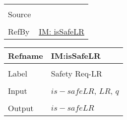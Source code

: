\documentclass[12pt]{article}
\begin{document}
\begin{minipage}{\textwidth}
\begin{tabular}{>{\raggedright}p{}>{\raggedright\arraybackslash}p{}}
\\ \midrule \\
Source & \cite{astm2009}
         
\\ \midrule \\
RefBy & \hyperref[IM:isSafeLR]{IM: isSafeLR}
        
\\ \bottomrule
\end{tabular}
\end{minipage}
\vspace{\baselineskip}
\noindent
\begin{minipage}{\textwidth}
\begin{tabular}{>{\raggedright}p{}>{\raggedright\arraybackslash}p{}}
\toprule \textbf{Refname} & \textbf{IM:isSafeLR}
\label{IM:isSafeLR}
\\ \midrule \\
Label & Safety Req-LR
        
\\ \midrule \\
Input & $is-safeLR$, $LR$, $q$
        
\\ \midrule \\
Output & $is-safeLR$
         

\end{tabular}
\end{minipage}
\end{document}
